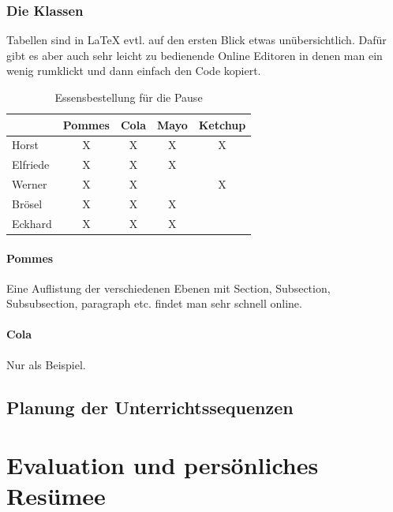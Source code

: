 \documentclass[a4paper, 12pt]{article}
\begin{document}
\subsubsection{Die Klassen}

Tabellen sind in \LaTeX{} evtl. auf den ersten Blick etwas unübersichtlich. Dafür gibt es aber auch sehr leicht zu bedienende Online Editoren in denen man ein wenig rumklickt und dann einfach den Code kopiert.

\begin{table}[hbtp]
\centering
\begin{tabular}{l|c|c|c|c|}
\cline{2-5}
                                & Pommes  & Cola   & Mayo    & Ketchup \\ \hline
\multicolumn{1}{|l|}{Horst}     & X       & X      & X       & X       \\ \hline
\multicolumn{1}{|l|}{Elfriede}  & X       & X      & X       &         \\ \hline
\multicolumn{1}{|l|}{Werner}    & X       & X      &         & X       \\ \hline
\multicolumn{1}{|l|}{Brösel}    & X       & X      & X       &         \\ \hline
\multicolumn{1}{|l|}{Eckhard}   & X       & X      & X       &         \\ \hline
\end{tabular}
\caption{Essensbestellung für die Pause}
\label{tab:essen}
\end{table}

\paragraph{Pommes}
Eine Auflistung der verschiedenen Ebenen mit Section, Subsection, Subsubsection, paragraph etc. findet man sehr schnell online.

\paragraph{Cola}
Nur als Beispiel.

\subsection{Planung der Unterrichtssequenzen}

\newpage
\section{Evaluation und persönliches Resümee}
\end{document}
